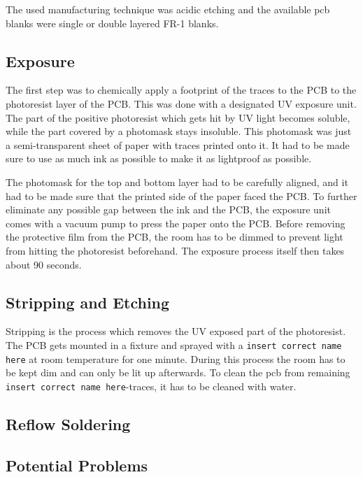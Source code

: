 The used manufacturing technique was acidic etching %
and the available \gls{pcb} blanks were single or double layered FR-1 blanks. %

\subsection{Exposure}

The first step was to chemically apply a footprint of the traces to the PCB to the photoresist layer of the PCB. This was done with a designated UV exposure unit. The part of the positive photoresist which gets hit by UV light becomes soluble, while the part covered by a photomask stays insoluble. This photomask was just a semi-transparent sheet of paper with traces printed onto it. It had to be made sure to use as much ink as possible to make it as lightproof as possible.

The photomask for the top and bottom layer had to be carefully aligned, and it had to be made sure that the printed side of the paper faced the PCB. To further eliminate any possible gap between the ink and the PCB, the exposure unit comes with a vacuum pump to press the paper onto the PCB. Before removing the protective film from the PCB, the room has to be dimmed to prevent light from hitting the photoresist beforehand. The exposure process itself then takes about 90 seconds.

\subsection{Stripping and Etching}

Stripping is the process which removes the UV exposed part of the photoresist. The PCB gets mounted in a fixture and sprayed with a \texttt{insert correct name here} at room temperature for one minute. During this process the room has to be kept dim and can only be lit up afterwards. To clean the \gls{pcb} from remaining \texttt{insert correct name here}-traces, it has to be cleaned with water.



\subsection{Reflow Soldering}

\subsection{Potential Problems}